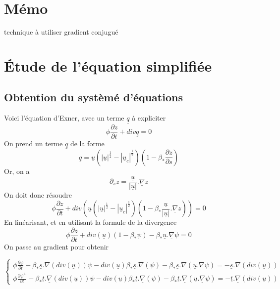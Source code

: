 \documentclass[a4paper,10pt]{article}
\title{}
\author{Arnaud Paran}
\begin{document}
  \maketitle

  \begin{abstract}

  \end{abstract}

  \section{Mémo}
  technique à utiliser gradient conjugué

  \section{Étude de l'équation simplifiée}
      
  \subsection{Obtention du systèmé d'équations}
  Voici l'équation d'Exner, avec un terme $\underline{q}$ à expliciter
  \begin{equation}\label{eq}
    \phi\frac{\partial z}{\partial t}+div\underline{q}=0
  \end{equation}
  On prend un terme $\underline{q}$ de la forme
  \begin{equation}
    \underline{q}=\underline{u}(|\underline{u}|^{\frac{1}{2}}-|\underline{u}_c|^{\frac{1}{2}})(1-\beta_*\frac{\partial z}{\partial s})
  \end{equation}
  Or, on a 
  \[\partial_sz=\frac{\underline{u}}{|\underline{u}|}.\underline\nabla z\]
  On doit donc résoudre
  \[\phi\frac{\partial z}{\partial t}+div(\underline{u}(|\underline{u}|^{\frac{1}{2}}-|\underline{u}_c|^{\frac{1}{2}})(1-\beta_*\frac{\underline{u}}{|\underline{u}|}.\underline\nabla z))=0\]
  En linéarisant, et en utilisant la formule de la divergence
  \[\phi\frac{\partial z}{\partial t}+div(\underline{u})(1-\beta_*\psi)-\beta_*\underline{u}.\underline{\nabla}\psi=0\]
  On passe au gradient pour obtenir
  
  \begin{equation}
    \left\{\begin{array}{l}
      \phi\frac{\partial \psi}{\partial t}-\beta_*\underline{s}.\underline{\nabla}(div(\underline{u}))\psi-div(\underline{u})\beta_*\underline{s}.\underline\nabla(\psi)-\beta_*\underline{s}.\underline{\nabla}(\underline{u}.\underline{\nabla}\psi)=-\underline{s}.\underline{\nabla}(div(\underline{u}))\\
      \phi\frac{\partial \psi^\perp}{\partial t}-\beta_*\underline{t}.\underline{\nabla}(div(\underline{u}))\psi-div(\underline{u})\beta_*\underline{t}.\underline\nabla(\psi)-\beta_*\underline{t}.\underline{\nabla}(\underline{u}.\underline{\nabla}\psi)=-\underline{t}.\underline{\nabla}(div(\underline{u}))
    \end{array}\right.
  \end{equation}
  
\end{document}
